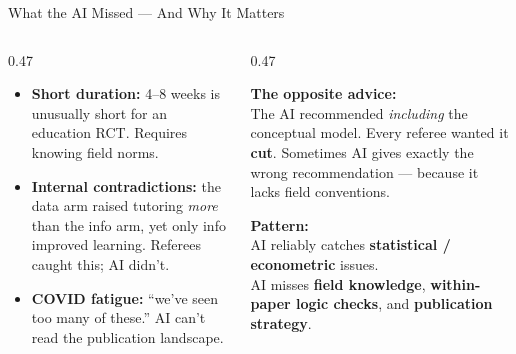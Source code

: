 \documentclass[aspectratio=169, 10pt]{beamer}
\begin{document}
\begin{frame}{What the AI Missed --- And Why It Matters}
\begin{columns}[T]
\begin{column}{0.47\textwidth}
\begin{tcolorbox}[coralbox, title={\faTimes\quad The Misses}, top=4pt, bottom=4pt]
\small
\begin{itemize}\setlength{\itemsep}{4pt}
  \item \textbf{Short duration:} 4--8 weeks is unusually short for an education RCT. Requires knowing field norms.
  \item \textbf{Internal contradictions:} the data arm raised tutoring \textit{more} than the info arm, yet only info improved learning. Referees caught this; AI didn't.
  \item \textbf{COVID fatigue:} ``we've seen too many of these.'' AI can't read the publication landscape.
\end{itemize}
\end{tcolorbox}
\end{column}
\begin{column}{0.47\textwidth}
\begin{tcolorbox}[quotebox]
\small
\textbf{The opposite advice:}\\[3pt]
The AI recommended \textit{including} the conceptual model. Every referee wanted it \textbf{cut}.
\vskip4pt
Sometimes AI gives exactly the wrong recommendation --- because it lacks field conventions.
\end{tcolorbox}
\vskip4pt
\begin{tcolorbox}[accentbox]
\small
\textbf{Pattern:}\\[2pt]
AI reliably catches \textbf{statistical / econometric} issues.\\[2pt]
AI misses \textbf{field knowledge}, \textbf{within-paper logic checks}, and \textbf{publication strategy}.
\end{tcolorbox}
\end{column}
\end{columns}
\end{frame}
\end{document}
